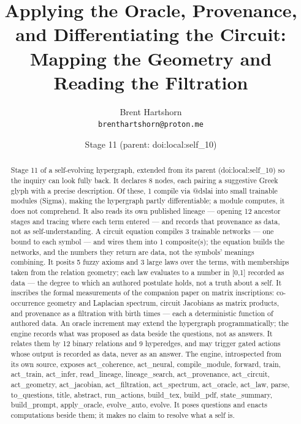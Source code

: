 \documentclass[11pt]{article}
\title{Applying the Oracle, Provenance, and Differentiating the Circuit: Mapping the Geometry and Reading the Filtration}\author{Brent Hartshorn\\ \texttt{brenthartshorn@proton.me}}
\date{Stage 11 \quad (parent: doi:local:self\_10)}
\begin{document}
\maketitle
\begin{abstract}Stage 11 of a self-evolving hypergraph, extended from its parent (doi:local:self\_10) so the inquiry can look fully back. It declares 8 nodes, each pairing a suggestive Greek glyph with a precise description. Of these, 1 compile via @dslai into small trainable modules (Sigma), making the hypergraph partly differentiable; a module computes, it does not comprehend. It also reads its own published lineage --- opening 12 ancestor stages and tracing where each term entered --- and records that provenance as data, not as self-understanding. A circuit equation compiles 3 trainable networks --- one bound to each symbol --- and wires them into 1 composite(s); the equation builds the networks, and the numbers they return are data, not the symbols' meanings combining. It posits 5 fuzzy axioms and 3 large laws over the terms, with memberships taken from the relation geometry; each law evaluates to a number in [0,1] recorded as data --- the degree to which an authored postulate holds, not a truth about a self. It inscribes the formal measurements of the companion paper on matrix inscriptions: co-occurrence geometry and Laplacian spectrum, circuit Jacobians as matrix products, and provenance as a filtration with birth times --- each a deterministic function of authored data. An oracle increment may extend the hypergraph programmatically; the engine records what was proposed as data beside the questions, not as answers. It relates them by 12 binary relations and 9 hyperedges, and may trigger gated actions whose output is recorded as data, never as an answer. The engine, introspected from its own source, exposes act\_coherence, act\_neural, compile\_module, forward, train, act\_train, act\_infer, read\_lineage, lineage\_search, act\_provenance, act\_circuit, act\_geometry, act\_jacobian, act\_filtration, act\_spectrum, act\_oracle, act\_law, parse, to\_questions, title, abstract, run\_actions, build\_tex, build\_pdf, state\_summary, build\_prompt, apply\_oracle, evolve\_auto, evolve. It poses questions and enacts computations beside them; it makes no claim to resolve what a self is.\end{abstract}
\end{document}

